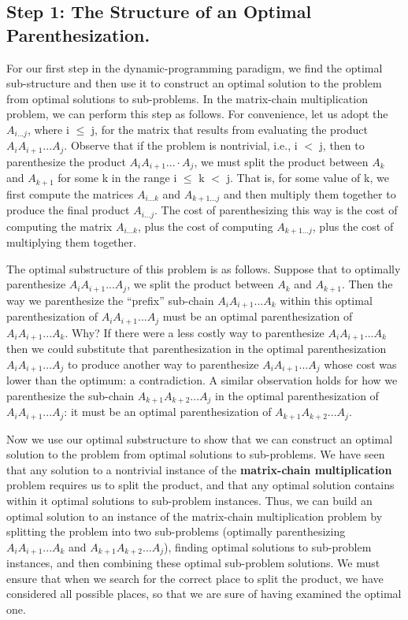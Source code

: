 \subsection{Step 1: The Structure of an Optimal Parenthesization.}

For our first step in the dynamic-programming paradigm, we find the optimal sub-structure and then use it to construct an optimal solution to the problem from optimal solutions to sub-problems. In the matrix-chain multiplication problem, we can perform this step as follows. For convenience, let us adopt the  $A_{i ... j}$, where i $\leq$ j, for the matrix that results from evaluating the product $A_{i} A_{i+1} ... A_{j}$. Observe that if the problem is nontrivial, i.e., i $<$ j, then to parenthesize the product $A_{i} A_{i+1} ... \cdot A_{j}$, we must split the product between $A_{k}$ and $A_{k+1}$ for some k in the range i $\leq$ k $<$ j. That is, for some value of k, we first compute the matrices $A_{i...k}$ and $A_{k+1...j}$ and then multiply them together to produce the final product $A_{i...j}$. The cost of parenthesizing this way is the cost of computing the matrix $A_{i...k}$, plus the cost of computing $A_{k+1...j}$, plus the cost of multiplying them together. \hfill \break

The optimal substructure of this problem is as follows. Suppose that to optimally parenthesize $A_{i} A_{i+1} ... A_{j}$, we split the product between $A_{k}$ and $A_{k+1}$. Then the way we parenthesize the “prefix” sub-chain $A_{i} A_{i+1} ... A_{k}$ within this optimal parenthesization of $A_{i} A_{i+1} ... A_{j}$ must be an optimal parenthesization of $A_{i} A_{i+1} ... A_{k}$. Why? If there were a less costly way to parenthesize $A_{i} A_{i+1} ... A_{k}$ then we could substitute that parenthesization in the optimal parenthesization $A_{i} A_{i+1} ... A_{j}$ to produce another way to parenthesize $A_{i} A_{i+1} ... A_{j}$ whose cost was lower than the optimum: a contradiction. A similar observation holds for how we parenthesize the sub-chain $A_{k+1} A_{k+2} ... A_{j}$ in the optimal parenthesization of $A_{i} A_{i+1} ... A_{j}$: it must be an optimal parenthesization of $A_{k+1} A_{k+2} ... A_{j}$. \hfill \break

Now we use our optimal substructure to show that we can construct an optimal solution to the problem from optimal solutions to sub-problems. We have seen that any solution to a nontrivial instance of the {\bfseries matrix-chain multiplication} problem requires us to split the product, and that any optimal solution contains within it optimal solutions to sub-problem instances. Thus, we can build an optimal solution to an instance of the matrix-chain multiplication problem by splitting the problem into two sub-problems (optimally parenthesizing $A_{i} A_{i+1} ... A_{k}$ and $A_{k+1} A_{k+2} ... A_{j}$), finding optimal solutions to sub-problem instances, and then combining these optimal sub-problem solutions. We must ensure that when we search for the correct place to split the product, we have considered all possible places, so that we are sure of having examined the optimal one.

\pagebreak